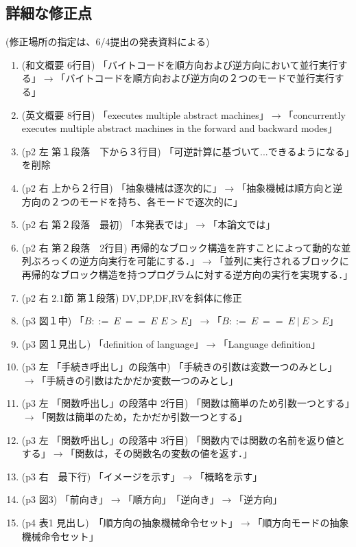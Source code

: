 \documentclass[a4j]{jarticle}
\begin{document}
\subsection*{詳細な修正点}

(修正場所の指定は、6/4提出の発表資料による)

\begin{enumerate}
\item (和文概要 6行目) 「バイトコードを順方向および逆方向において並行実行する」$\rightarrow$「バイトコードを順方向および逆方向の２つのモードで並行実行する」
\item (英文概要 8行目) 「executes multiple abstract machines」$\rightarrow$「concurrently executes multiple abstract machines in the forward and backward modes」
\item (p2 左 第１段落　下から３行目) 「可逆計算に基づいて...できるようになる」を削除
\item (p2 右 上から２行目) 「抽象機械は逐次的に」$\rightarrow$「抽象機械は順方向と逆方向の２つのモードを持ち、各モードで逐次的に」
\item (p2 右 第２段落　最初) 「本発表では」$\rightarrow$「本論文では」
\item (p2 右 第２段落　2行目) 再帰的なブロック構造を許すことによって動的な並列ぶろっくの逆方向実行を可能にする．」$\rightarrow$「並列に実行されるブロックに再帰的なブロック構造を持つプログラムに対する逆方向の実行を実現する．」
\item (p2 右 2.1節 第１段落) DV,DP,DF,RVを斜体に修正
\item (p3 図１中) 「$B::=\ E\ ==\ E$ $E>E$」$\rightarrow$「$B::=\ E\ ==\ E\ |\ E>E$」
\item (p3 図１見出し) 「definition of language」$\rightarrow$「Language definition」
\item (p3 左 「手続き呼出し」の段落中) 「手続きの引数は変数一つのみとし」$\rightarrow$「手続きの引数はたかだか変数一つのみとし」
\item (p3 左 「関数呼出し」の段落中 2行目) 「関数は簡単のため引数一つとする」$\rightarrow$「関数は簡単のため，たかだか引数一つとする」
\item (p3 左 「関数呼出し」の段落中 3行目) 「関数内では関数の名前を返り値とする」$\rightarrow$「関数は，その関数名の変数の値を返す．」
\item (p3 右　最下行) 「イメージを示す」$\rightarrow$「概略を示す」
\item (p3 図3) 「前向き」$\rightarrow$「順方向」　「逆向き」$\rightarrow$「逆方向」
\item (p4 表1 見出し)　「順方向の抽象機械命令セット」$\rightarrow$「順方向モードの抽象機械命令セット」 

\end{enumerate}
\end{document}
